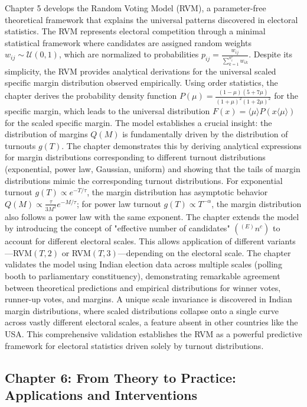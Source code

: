 Chapter 5 develops the Random Voting Model (RVM), a parameter-free theoretical framework that explains the universal patterns discovered in electoral statistics. The RVM represents electoral competition through a minimal statistical framework where candidates are assigned random weights $w_{ij} \sim \mathcal{U}(0,1)$, which are normalized to probabilities $p_{ij} = \frac{w_{ij}}{\sum_{k=1}^{n^c_i} w_{ik}}$. Despite its simplicity, the RVM provides analytical derivations for the universal scaled specific margin distribution observed empirically. Using order statistics, the chapter derives the probability density function $P(\mu) = \frac{(1 - \mu)(5 + 7\mu)}{(1 + \mu)^2(1 + 2\mu)^2}$ for the specific margin, which leads to the universal distribution $F(x) = \langle \mu \rangle P(x\langle \mu \rangle)$ for the scaled specific margin. The model establishes a crucial insight: the distribution of margins $Q(M)$ is fundamentally driven by the distribution of turnouts $g(T)$. The chapter demonstrates this by deriving analytical expressions for margin distributions corresponding to different turnout distributions (exponential, power law, Gaussian, uniform) and showing that the tails of margin distributions mimic the corresponding turnout distributions. For exponential turnout $g(T) \propto e^{-T/\tau}$, the margin distribution has asymptotic behavior $Q(M) \propto \frac{\tau}{3M^2}e^{-M/\tau}$; for power law turnout $g(T) \propto T^{-\alpha}$, the margin distribution also follows a power law with the same exponent. The chapter extends the model by introducing the concept of "effective number of candidates" $(^{(E)}n^c)$ to account for different electoral scales. This allows application of different variants—RVM$(T,2)$ or RVM$(T,3)$—depending on the electoral scale. The chapter validates the model using Indian election data across multiple scales (polling booth to parliamentary constituency), demonstrating remarkable agreement between theoretical predictions and empirical distributions for winner votes, runner-up votes, and margins. A unique scale invariance is discovered in Indian margin distributions, where scaled distributions collapse onto a single curve across vastly different electoral scales, a feature absent in other countries like the USA. This comprehensive validation establishes the RVM as a powerful predictive framework for electoral statistics driven solely by turnout distributions.

\subsection*{Chapter 6: From Theory to Practice: Applications and Interventions}

